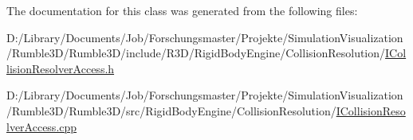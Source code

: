 The documentation for this class was generated from the following files\+:\begin{DoxyCompactItemize}
\item 
D\+:/\+Library/\+Documents/\+Job/\+Forschungsmaster/\+Projekte/\+Simulation\+Visualization/\+Rumble3\+D/\+Rumble3\+D/include/\+R3\+D/\+Rigid\+Body\+Engine/\+Collision\+Resolution/\mbox{\hyperlink{_i_collision_resolver_access_8h}{I\+Collision\+Resolver\+Access.\+h}}\item 
D\+:/\+Library/\+Documents/\+Job/\+Forschungsmaster/\+Projekte/\+Simulation\+Visualization/\+Rumble3\+D/\+Rumble3\+D/src/\+Rigid\+Body\+Engine/\+Collision\+Resolution/\mbox{\hyperlink{_i_collision_resolver_access_8cpp}{I\+Collision\+Resolver\+Access.\+cpp}}\end{DoxyCompactItemize}
